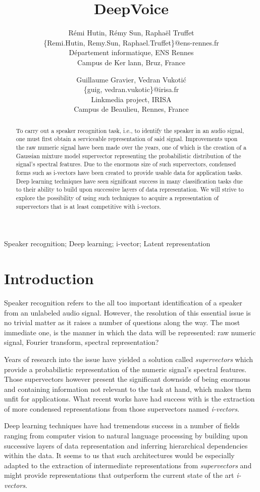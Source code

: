 \documentclass[conference]{IEEEtran}
\title{DeepVoice}
\author{Rémi Hutin, Rémy Sun, Raphaël Truffet \\
  \{Remi.Hutin, Remy.Sun, Raphael.Truffet\}@ens-rennes.fr \\
  Département informatique, ENS Rennes \\
  Campus de Ker lann, Bruz, France
\and
  Guillaume Gravier, Vedran Vukotić\\
  \{guig, vedran.vukotic\}@irisa.fr\\
  Linkmedia project, IRISA \\
  Campus de Beaulieu, Rennes, France
}
\begin{document}
\maketitle

\begin{abstract}
  To carry out a speaker recognition task, i.e., to identify the speaker in an
audio signal, one must first obtain a serviceable representation
of said signal. Improvements upon the raw numeric signal have been made over the
years, one of which is the creation of a Gaussian mixture model supervector
representing the probabilistic distribution of the signal's
spectral features. Due to the enormous size of such supervectors, condensed
forms such as i-vectors have been created to provide usable data for application
tasks. Deep learning techniques have seen significant success in many
classification tasks due to their ability to
build upon successive layers of data representation. We will
strive to explore the possibility of using such techniques to acquire a
representation of supervectors that is at least competitive with i-vectors.

\end{abstract}
\begin{IEEEkeywords}
  Speaker recognition; Deep learning;  i-vector; Latent representation
\end{IEEEkeywords}
\section{Introduction}

Speaker recognition refers to the all too important identification of a speaker
from an unlabeled audio signal. However, the resolution of this essential issue
is no trivial matter as it raises a number of questions along the way. The most
immediate one, is the manner in which the data will be represented: raw numeric
signal, Fourier transform, spectral representation?

Years of research into the issue have yielded a solution called
\emph{supervectors} which provide a probabilistic representation of the
numeric signal's spectral features. Those supervectors however present the
significant downside of being enormous and containing information not relevant
to the task at hand, which makes them unfit for applications. What recent works
have had success with is the extraction of more condensed representations from
those supervectors named \emph{i-vectors}.

Deep learning techniques have had tremendous success in a number of fields
ranging from computer vision \cite{lecun1998gradient} to natural language
processing \cite{bordes2012joint} by building upon successive layers of data
representation and inferring hierarchical dependencies within the data. It seems
to us that such architectures would be especially adapted to the extraction of
intermediate representations from \emph{supervectors} and might provide
representations that outperform the current state of the art \emph{i-vectors}.
\end{document}
